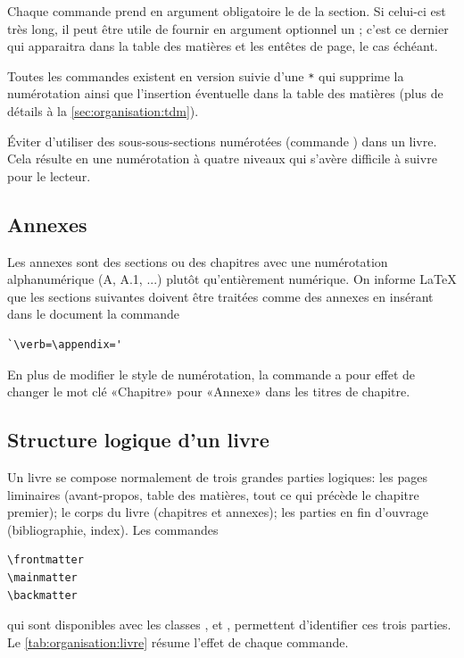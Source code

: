 Chaque commande prend en argument obligatoire le  de la
section. Si celui-ci est très long, il peut être utile de fournir en
argument optionnel un ; c'est ce dernier qui
apparaitra dans la table des matières et les entêtes de page, le cas
échéant.

Toutes les commandes existent en version suivie d'une \verb=*= qui
supprime la numérotation ainsi que l'insertion éventuelle dans la
table des matières (plus de détails à la \autoref{sec:organisation:tdm}).

\begin{conseil}
  Éviter d'utiliser des sous-sous-sections numérotées (commande
  \cmdprint{\subsubsection}) dans un livre. Cela résulte en une
  numérotation à quatre niveaux qui s'avère difficile à suivre pour le
  lecteur.
\end{conseil}

\subsection{Annexes}
\label{sec:organisation:parties:annexes}

Les annexes sont des sections ou des chapitres avec une numérotation
alphanumérique (A, A.1, ...) plutôt qu'entièrement numérique. On
informe {\LaTeX} que les sections suivantes doivent être traitées
comme des annexes en insérant dans le document la commande
\begin{lstlisting}
`\verb=\appendix='
\end{lstlisting}
En plus de modifier le style de numérotation, la commande a pour effet
de changer le mot clé «Chapitre» pour «Annexe» dans les titres de
chapitre.

\subsection{Structure logique d'un livre}
\label{sec:oganisation:parties:livre}

Un livre se compose normalement de trois grandes parties logiques: les
pages liminaires (avant-propos, table des matières, tout ce qui
précède le chapitre premier); le corps du livre (chapitres et
annexes); les parties en fin d'ouvrage (bibliographie, index). Les
commandes
\begin{lstlisting}
\frontmatter
\mainmatter
\backmatter
\end{lstlisting}
qui sont disponibles avec les classes ,  et
, permettent d'identifier ces trois parties. Le
\autoref{tab:organisation:livre} résume l'effet de chaque commande.


